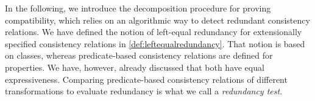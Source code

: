 In the following, we introduce the decomposition procedure for proving compatibility, which relies on an algorithmic way to detect redundant consistency relations. 
We have defined the notion of left-equal redundancy for extensionally specified consistency relations in \autoref{def:leftequalredundancy}.
That notion is based on classes, whereas predicate-based consistency relations are defined for properties.
We have, however, already discussed that both have equal expressiveness.
Comparing predicate-based consistency relations of different transformations to evaluate redundancy is what we call a 
\textit{redundancy test}.

